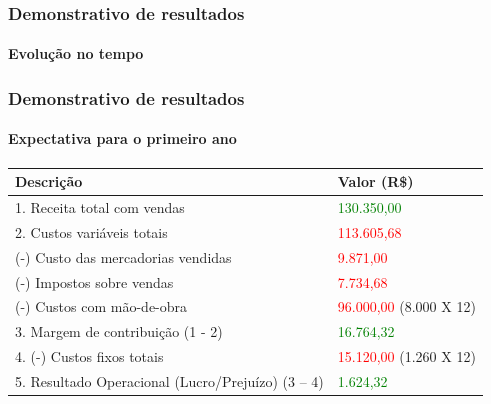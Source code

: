 \documentclass{beamer}
\begin{document}
\begin{frame}
  \frametitle{Demonstrativo de resultados}
  \framesubtitle{Evolução no tempo}

  \begin{center}
  \end{center}
\end{frame}

\begin{frame}
  \frametitle{Demonstrativo de resultados}
  \framesubtitle{Expectativa para o primeiro ano}

  \begin{small}
    \begin{tabular}{| l | l |}
      \hline
      \textbf{Descrição} & \textbf{Valor (R\$)}\\ \hline
      1. Receita total com vendas & \textcolor{green}{130.350,00}\\ \hline \hline
      2. Custos variáveis totais & \textcolor{red}{113.605,68}\\ \hline
      (-) Custo das mercadorias vendidas & \textcolor{red}{9.871,00}\\ \hline
      (-) Impostos sobre vendas & \textcolor{red}{7.734,68} \\ \hline
      (-) Custos com mão-de-obra & \textcolor{red}{96.000,00} (8.000 X 12)\\ \hline \hline
      3. Margem de contribuição (1 - 2) & \textcolor{green}{16.764,32}\\ \hline \hline
      4. (-) Custos fixos totais & \textcolor{red}{15.120,00} (1.260 X 12)\\ \hline \hline
      5. Resultado Operacional (Lucro/Prejuízo) (3 – 4) & \textcolor{green}{1.624,32}\\ \hline
    \end{tabular}
  \end{small}
\end{frame}
\end{document}
